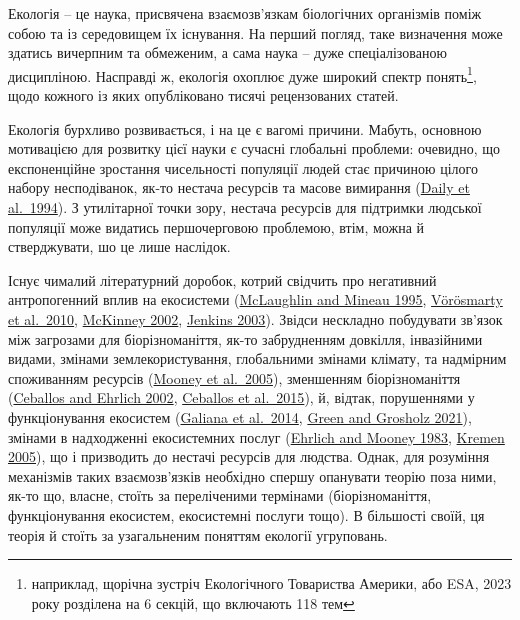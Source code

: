 \documentclass[
  11pt,
]{book}
\begin{document}
Екологія -- це наука, присвячена взаємозв'язкам біологічних організмів поміж собою та із середовищем їх існування. На перший погляд, таке визначення може здатись вичерпним та обмеженим, а сама наука -- дуже спеціалізованою дисципліною. Насправді ж, екологія охоплює дуже широкий спектр понять\footnote{наприклад, щорічна зустріч Екологічного Товариства Америки, або ESA, 2023 року розділена на 6 секцій, що включають 118 тем}, щодо кожного із яких опубліковано тисячі рецензованих статей.

Екологія бурхливо розвивається, і на це є вагомі причини. Мабуть, основною мотивацією для розвитку цієї науки є сучасні глобальні проблеми: очевидно, що експоненційне зростання чисельності популяції людей стає причиною цілого набору несподіванок, як-то нестача ресурсів та масове вимирання (\href{https://www.jstor.org/stable/27503368}{Daily et al.~1994}). З утилітарної точки зору, нестача ресурсів для підтримки людської популяції може видатись першочерговою проблемою, втім, можна й стверджувати, шо це лише наслідок.

Існує чималий літературний доробок, котрий свідчить про негативний антропогенний вплив на екосистеми (\href{htpps://doi.org/10.1016/0167-8809(95)00609-V}{McLaughlin and Mineau 1995}, \href{https://doi.org/10.1038/nature09440}{Vörösmarty et al.~2010}, \href{https://academic.oup.com/bioscience/article/52/10/883-890/354714}{McKinney 2002}, \href{https://doi.org/10.1126/science.1088666}{Jenkins 2003}). Звідси нескладно побудувати зв'язок між загрозами для біорізноманіття, як-то забрудненням довкілля, інвазійними видами, змінами землекористування, глобальними змінами клімату, та надмірним споживанням ресурсів (\href{https://www.millenniumassessment.org/}{Mooney et al.~2005}), зменшенням біорізноманіття (\href{https://doi.org/10.1126/science.1069349}{Ceballos and Ehrlich 2002}, \href{https://doi.org/10.1126/sciadv.1400253}{Ceballos et al.~2015}), й, відтак, порушеннями у функціонування екосистем (\href{https://doi.org/10.1111/j.1600-0706.2013.00859.x}{Galiana et al.~2014}, \href{https://doi.org/https://doi.org/10.1002/fee.2277}{Green and Grosholz 2021}), змінами в надходженні екосистемних послуг (\href{https://doi.org/10.2307/1309037}{Ehrlich and Mooney 1983}, \href{https://doi.org/10.1111/j.1461-0248.2005.00751.x}{Kremen 2005}), що і призводить до нестачі ресурсів для людства. Однак, для розуміння механізмів таких взаємозв'язків необхідно спершу опанувати теорію поза ними, як-то що, власне, стоїть за переліченими термінами (біорізноманіття, функціонування екосистем, екосистемні послуги тощо). В більшості своїй, ця теорія й стоїть за узагальненим поняттям екології угруповань.
\end{document}
